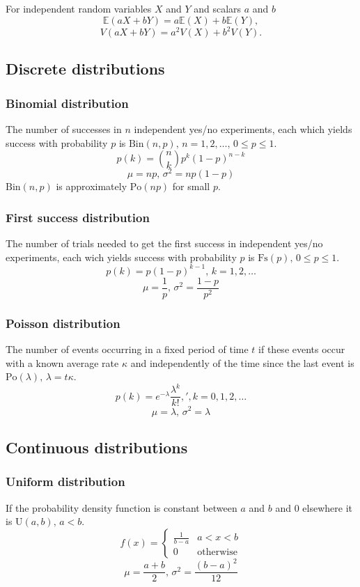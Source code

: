 For independent random variables $X$ and $Y$ and scalars $a$ and $b$
\[\mathbb{E}(aX+bY) = a\mathbb{E}(X)+b\mathbb{E}(Y),\]
\[V(aX+bY) = a^2V(X)+b^2V(Y).\]

\subsection{Discrete distributions}

\subsubsection{Binomial distribution}
The number of successes in $n$ independent yes/no experiments, each which yields success with probability $p$ is $\textrm{Bin}(n,p),\,n=1,2,\dots,\, 0\leq p\leq1$.
\[p(k)=\binom{n}{k}p^k(1-p)^{n-k}\]
\[\mu = np,\,\sigma^2=np(1-p)\]
$\textrm{Bin}(n,p)$ is approximately $\textrm{Po}(np)$ for small $p$.

\subsubsection{First success distribution}
The number of trials needed to get the first success in independent yes/no experiments, each wich yields success with probability $p$ is $\textrm{Fs}(p),\,0\leq p\leq1$.
\[p(k)=p(1-p)^{k-1},\,k=1,2,\dots\]
\[\mu = \frac1p,\,\sigma^2=\frac{1-p}{p^2}\]

\subsubsection{Poisson distribution}
The number of events occurring in a fixed period of time $t$ if these events occur with a known average rate $\kappa$ and independently of the time since the last event is $\textrm{Po}(\lambda),\,\lambda=t\kappa$.
\[p(k)=e^{-\lambda}\frac{\lambda^k}{k!},',k=0,1,2,\dots\]
\[\mu=\lambda,\,\sigma^2=\lambda\]

\subsection{Continuous distributions}

\subsubsection{Uniform distribution}
If the probability density function is constant between $a$ and $b$ and 0 elsewhere it is $\textrm{U}(a,b),\,a<b$.
\[f(x) = \left\{
\begin{array}{cl}
\frac{1}{b-a} & a<x<b\\
0 & \textrm{otherwise}
\end{array}\right.\]
\[\mu=\frac{a+b}{2},\,\sigma^2=\frac{(b-a)^2}{12}\]

